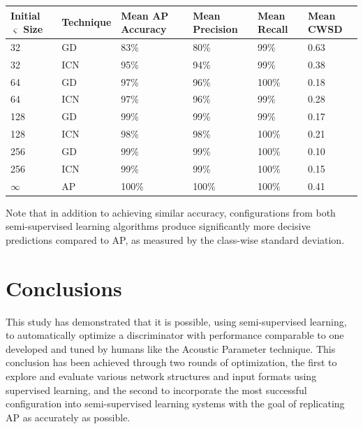 \documentclass[10pt]{article}
\begin{document}
\begin{minipage}{\textwidth}
    \begin{center}
        \begin{tabular}{|l|l|l|l|l|l|}
            \hline
            Initial $\varsigma$ Size & Technique & Mean AP Accuracy & Mean Precision & Mean Recall & Mean CWSD \\
            \hline
            32 & GD & 83\% & 80\% & 99\% & 0.63 \\
            \hline
            32 & ICN & 95\% & 94\% & 99\% & 0.38 \\
            \hline
            64 & GD & 97\% & 96\% & 100\% & 0.18 \\
            \hline
            64 & ICN & 97\% & 96\% & 99\% & 0.28 \\
            \hline
            128 & GD & 99\% & 99\% & 99\% & 0.17 \\
            \hline
            128 & ICN & 98\% & 98\% & 100\% & 0.21 \\
            \hline
            256 & GD & 99\% & 99\% & 100\% & 0.10 \\
            \hline
            256 & ICN & 99\% & 99\% & 100\% & 0.15 \\
            \hline
            $\infty$ & AP & 100\% & 100\% & 100\% & 0.41 \\
            \hline
        \end{tabular}
    \end{center}
\end{minipage}

Note that in addition to achieving similar accuracy, configurations from both semi-supervised learning algorithms produce significantly more decisive predictions compared to AP, as measured by the class-wise standard deviation.

\section{Conclusions}

This study has demonstrated that it is possible, using semi-supervised learning, to automatically optimize a discriminator with performance comparable to one developed and tuned by humans like the Acoustic Parameter technique. This conclusion has been achieved through two rounds of optimization, the first to explore and evaluate various network structures and input formats using supervised learning, and the second to incorporate the most successful configuration into semi-supervised learning systems with the goal of replicating AP as accurately as possible.
\end{document}
